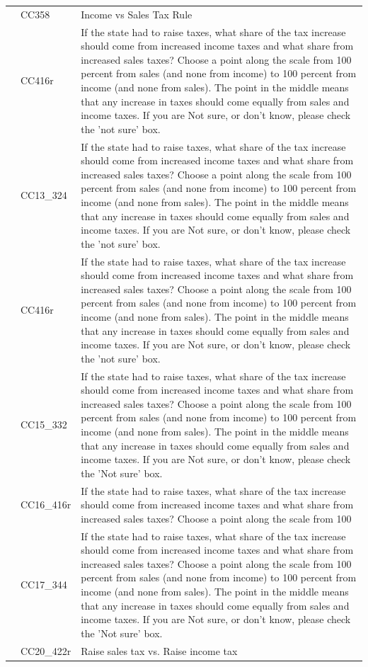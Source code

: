 \documentclass[
  12pt]{article}
\begin{document}
\begin{longtable}[t]{rl>{\raggedright\arraybackslash}p{10cm}}
\addlinespace
2011 & CC358 & Income vs Sales Tax Rule\\
\addlinespace
2012 & CC416r & If the state had to raise taxes, what share of the tax increase should come from increased income taxes and what share from increased sales taxes? Choose a point along the scale from 100 percent from sales (and none from income) to 100 percent from income (and none from sales). The point in the middle means that any increase in taxes should come equally from sales and income taxes. If you are Not sure, or don't know, please check the 'not sure' box.\\
\addlinespace
2013 & CC13\_324 & If the state had to raise taxes, what share of the tax increase should come from increased income taxes and what share from increased sales taxes? Choose a point along the scale from 100 percent from sales (and none from income) to 100 percent from income (and none from sales). The point in the middle means that any increase in taxes should come equally from sales and income taxes. If you are Not sure, or don't know, please check the 'not sure' box.\\
\addlinespace
2014 & CC416r & If the state had to raise taxes, what share of the tax increase should come from increased income taxes and what share from increased sales taxes? Choose a point along the scale from 100 percent from sales (and none from income) to 100 percent from income (and none from sales). The point in the middle means that any increase in taxes should come equally from sales and income taxes. If you are Not sure, or don't know, please check the 'not sure' box.\\
\addlinespace
2015 & CC15\_332 & If the state had to raise taxes, what share of the tax increase should come from increased income taxes and what share from increased sales taxes? Choose a point along the scale from 100 percent from sales (and none from income) to 100 percent from income (and none from sales). The point in the middle means that any increase in taxes should come equally from sales and income taxes. If you are Not sure, or don't know, please check the 'Not sure' box.\\
\addlinespace
2016 & CC16\_416r & If the state had to raise taxes, what share of the tax increase should come from increased income taxes and what share from increased sales taxes? Choose a point along the scale from 100\\
\addlinespace
2017 & CC17\_344 & If the state had to raise taxes, what share of the tax increase should come from increased income taxes and what share from increased sales taxes? Choose a point along the scale from 100 percent from sales (and none from income) to 100 percent from income (and none from sales). The point in the middle means that any increase in taxes should come equally from sales and income taxes. If you are Not sure, or don't know, please check the 'Not sure' box.\\
\addlinespace
2020 & CC20\_422r & Raise sales tax vs. Raise income tax\\*
\end{longtable}
\endgroup{}
\end{document}
